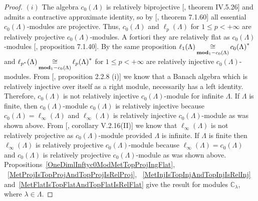 \begin{proof} $(i)$ The algebra $c_0(\Lambda)$ is relatively biprojective
[\cite{HelHomolBanTopAlg}, theorem IV.5.26] and admits a contractive approximate
identity, so by [\cite{HelBanLocConvAlg}, theorem 7.1.60] all essential
$c_0(\Lambda)$-modules are projective. Thus, $c_0(\Lambda)$ and $\ell_p(\Lambda)$
for $1\leq p<+\infty$ are relatively projective $c_0(\Lambda)$-modules. A
fortiori they are relatively flat as $c_0(\Lambda)$-modules
[\cite{HelBanLocConvAlg}, proposition 7.1.40]. By the same proposition
$\ell_1(\Lambda)\mathop{\mathbin{\cong}}\limits_{\mathbf{mod}_1-c_0(\Lambda)}{c_0(\Lambda)}^*$ and
$\ell_{p^*}(\Lambda)\mathop{\mathbin{\cong}}\limits_{\mathbf{mod}_1-c_0(\Lambda)}{\ell_p(\Lambda)}^*$ for
$1\leq p<+\infty$ are relatively injective $c_0(\Lambda)$-modules. From
[\cite{RamsHomPropSemgroupAlg}, proposition 2.2.8 (i)] we know that a Banach
algebra which is relatively injective over itself as a right module, necessarily 
has a left identity. Therefore, $c_0(\Lambda)$ is not relatively injective
$c_0(\Lambda)$-module for infinite $\Lambda$. If $\Lambda$ is finite, then
$c_0(\Lambda)$-module $c_0(\Lambda)$ is relatively injective because
$c_0(\Lambda)=\ell_\infty(\Lambda)$ and $\ell_\infty(\Lambda)$ is relatively
injective $c_0(\Lambda)$-module as was shown above. From
[\cite{HelHomolBanTopAlg}, corollary V.2.16(II)] we know that
$\ell_\infty(\Lambda)$ is not relatively projective as $c_0(\Lambda)$-module
provided $\Lambda$ is infinite. If $\Lambda$ is finite then
$\ell_\infty(\Lambda)$ is relatively projective $c_0(\Lambda)$-module because
$\ell_\infty(\Lambda)=c_0(\Lambda)$ and $c_0(\Lambda)$ is relatively projective
$c_0(\Lambda)$-module as was shown above.
Propositions~\ref{OneDimlInftyc0ModMetTopProjIngFlat},
~\ref{MetProjIsTopProjAndTopProjIsRelProj},
~\ref{MetInjIsTopInjAndTopInjIsRelInj}
and~\ref{MetFlatIsTopFlatAndTopFlatIsRelFlat} give the result for modules
$\mathbb{C}_\lambda$, where $\lambda\in\Lambda$.


\end{proof}

